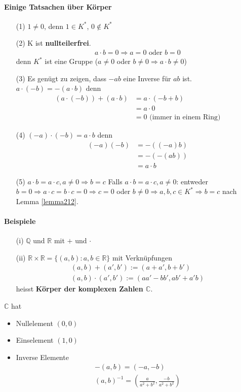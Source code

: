 \documentclass[11pt]{report}
\newcommand*\Zb[1] {\mathbb{#1}}
\newcommand*\f[1] {\textbf{#1}}
\begin{document}
\paragraph{Einige Tatsachen über Körper}
\begin{itemize}
 \item[(1)] $1\neq 0$, denn $1 \in K^{*}$, $0 \notin K^{*}$
 \item[(2)] K ist \f{nullteilerfrei}. 
\begin{align}
a \cdot b = 0 \Rightarrow a=0 \textrm{ oder } b=0 
\end{align}
denn $K^{*}$ ist eine Gruppe ($a \neq 0$ oder $b \neq 0 \Rightarrow a\cdot b \neq 0$)
 \item[(3)] Es genügt zu zeigen, dass $-ab$ eine Inverse für $ab$ ist. $a\cdot (-b) = -(a\cdot b)$ denn
\begin{align}
 (a\cdot (-b)) + (a\cdot b) &= a\cdot(-b+ b) \\
               &= a\cdot 0 \\
               &= 0\textrm{ (immer in einem Ring)}
\end{align}
\item[(4)] $(-a)\cdot(-b) = a\cdot b$ denn 
\begin{align}
(-a)(-b) &= - ((-a)b) \\
         &= -(-(ab)) \\
         &= a\cdot b
\end{align}
\item[(5)] $a\cdot b = a\cdot  c, a \neq 0 \Rightarrow b=c$
Falls $a\cdot b= a\cdot c, a \neq 0$: entweder $b=0 \Rightarrow a\cdot c = b \cdot c = 0 \Rightarrow c=0$
oder $b\neq 0 \Rightarrow a,b,c \in K^{*} \Rightarrow b=c$ nach Lemma \ref{lemma212}.
\end{itemize}

\paragraph{Beispiele}
\begin{itemize}
 \item[(i)] $\Zb{Q}$ und $\Zb{R}$ mit $+$ und  $\cdot$
 \item[(ii)] $\Zb{R}\times\Zb{R} = \{(a,b): a,b \in \Zb{R}\}$ mit Verknüpfungen
\begin{align}
 (a, b)+(a', b') := (a+a', b+b') \\
 (a, b)\cdot(a', b') := (aa' -bb', ab'+a'b)
\end{align}
heisst \f{Körper der komplexen Zahlen $\Zb{C}$}.\\
\end{itemize}
$\Zb{C}$ hat
\begin{itemize}
\item Nullelement $(0,0)$
\item Einselement $(1,0)$
\item Inverse Elemente
\begin{align}
 -(a,b) = (-a,-b) \\
 (a,b)^{-1} = (\frac{a}{a^2+b^2}, \frac{-b}{a^2+b^2})
\end{align}
\end{itemize}
\end{document}
